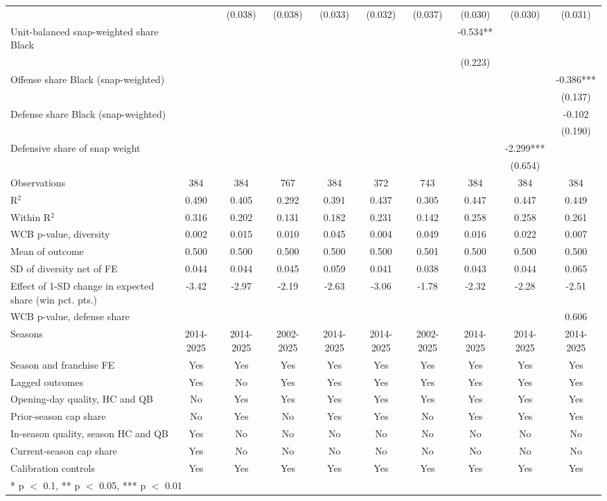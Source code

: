 \begin{table}[H]
{\begin{tabular}[t]{lccccccccc}
 &  & (0.038) & (0.038) & (0.033) & (0.032) & (0.037) & (0.030) & (0.030) & (0.031)\\
Unit-balanced snap-weighted share Black &  &  &  &  &  &  & -0.534** &  & \\
 &  &  &  &  &  &  & (0.223) &  & \\
Offense share Black (snap-weighted) &  &  &  &  &  &  &  &  & -0.386***\\
 &  &  &  &  &  &  &  &  & (0.137)\\
Defense share Black (snap-weighted) &  &  &  &  &  &  &  &  & -0.102\\
 &  &  &  &  &  &  &  &  & (0.190)\\
Defensive share of snap weight &  &  &  &  &  &  &  & -2.299*** & \\
 &  &  &  &  &  &  &  & (0.654) & \\
\midrule
Observations & 384 & 384 & 767 & 384 & 372 & 743 & 384 & 384 & 384\\
R$^2$ & 0.490 & 0.405 & 0.292 & 0.391 & 0.437 & 0.305 & 0.447 & 0.447 & 0.449\\
Within R$^2$ & 0.316 & 0.202 & 0.131 & 0.182 & 0.231 & 0.142 & 0.258 & 0.258 & 0.261\\
WCB p-value, diversity & 0.002 & 0.015 & 0.010 & 0.045 & 0.004 & 0.049 & 0.016 & 0.022 & 0.007\\
Mean of outcome & 0.500 & 0.500 & 0.500 & 0.500 & 0.500 & 0.501 & 0.500 & 0.500 & 0.500\\
SD of diversity net of FE & 0.044 & 0.044 & 0.045 & 0.059 & 0.041 & 0.038 & 0.043 & 0.044 & 0.065\\
Effect of 1-SD change in expected share (win pct. pts.) & -3.42 & -2.97 & -2.19 & -2.63 & -3.06 & -1.78 & -2.32 & -2.28 & -2.51\\
WCB p-value, defense share &  &  &  &  &  &  &  &  & 0.606\\
Seasons & 2014-2025 & 2014-2025 & 2002-2025 & 2014-2025 & 2014-2025 & 2002-2025 & 2014-2025 & 2014-2025 & 2014-2025\\
Season and franchise FE & Yes & Yes & Yes & Yes & Yes & Yes & Yes & Yes & Yes\\
Lagged outcomes & Yes & No & Yes & Yes & Yes & Yes & Yes & Yes & Yes\\
Opening-day quality, HC and QB & No & Yes & Yes & Yes & Yes & Yes & Yes & Yes & Yes\\
Prior-season cap share & No & Yes & No & Yes & Yes & No & Yes & Yes & Yes\\
In-season quality, season HC and QB & Yes & No & No & No & No & No & No & No & No\\
Current-season cap share & Yes & No & No & No & No & No & No & No & No\\
Calibration controls & Yes & Yes & Yes & Yes & Yes & Yes & Yes & Yes & Yes\\
\bottomrule
\multicolumn{10}{l}{\rule{0pt}{1em}* p $<$ 0.1, ** p $<$ 0.05, *** p $<$ 0.01}\\
\end{tabular}}
\end{table}

